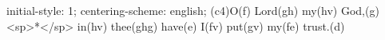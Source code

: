 initial-style: 1;
centering-scheme: english;
(c4)O(f) Lord(gh) my(hv) God,(g) <sp>*</sp> in(hv) thee(ghg) have(e) I(fv) put(gv) my(fe) trust.(d)
